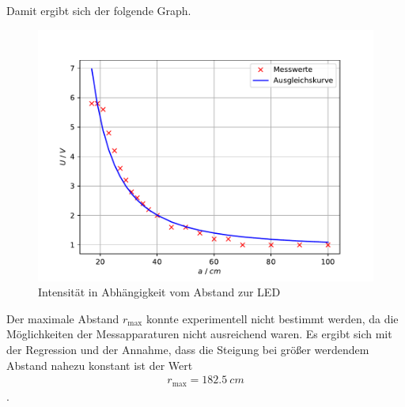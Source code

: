 Damit ergibt sich der folgende Graph.

\begin{figure}[h]
	\centering
	\includegraphics{led.pdf}
	\caption{Intensität in Abhängigkeit vom Abstand zur LED}
	\label{fig:led}
\end{figure}

Der maximale Abstand $r_\text{max}$ konnte experimentell nicht bestimmt werden, da die Möglichkeiten der Messapparaturen nicht ausreichend waren.
Es ergibt sich mit der Regression und der Annahme, dass die Steigung bei größer werdendem Abstand nahezu konstant ist der Wert
\begin{align}
	r_\text{max} = \SI{182,5}{cm}
\end{align}.
